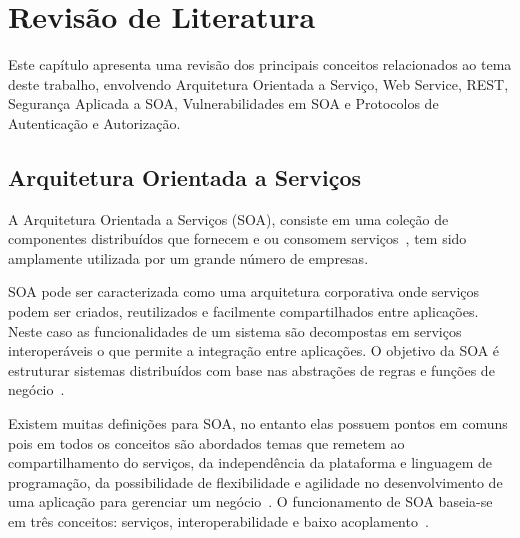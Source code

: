 \chapter{Revisão de Literatura}\label{cap:revisaolit}
Este capítulo apresenta uma revisão dos principais conceitos relacionados ao tema deste trabalho, envolvendo Arquitetura Orientada a Serviço, Web Service, REST, Segurança Aplicada a SOA, Vulnerabilidades em SOA e Protocolos de Autenticação e Autorização.

\section{Arquitetura Orientada a Serviços}


A Arquitetura Orientada a Serviços (SOA), consiste em uma coleção de componentes distribuídos que fornecem e ou consomem serviços~\cite{Clements2010}, tem sido amplamente utilizada por um grande número de empresas.


SOA pode ser caracterizada como uma arquitetura corporativa onde serviços podem ser criados, reutilizados e facilmente compartilhados entre aplicações. Neste caso as funcionalidades de um sistema são decompostas em serviços interoperáveis o que permite a integração entre aplicações. O objetivo da SOA é estruturar sistemas distribuídos com base nas abstrações de regras e funções de negócio~\cite{Josuttis07}.

Existem muitas definições para SOA, no entanto elas possuem pontos em comuns pois em todos os conceitos são abordados temas que remetem ao compartilhamento do serviços, da independência da plataforma e linguagem de programação, da possibilidade de flexibilidade e agilidade no desenvolvimento de uma aplicação para gerenciar um negócio~\cite{ERL09}. O funcionamento de SOA baseia-se em três conceitos: serviços, interoperabilidade e baixo acoplamento~\cite{Josuttis07}.

